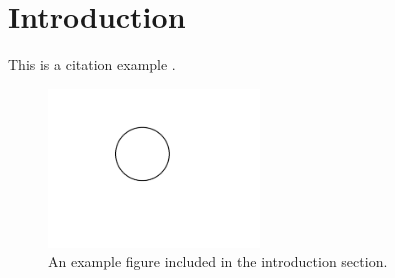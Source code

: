 \section{Introduction}
This is a citation example \cite{example2024}.

\begin{figure}[h]
    \centering
    \includegraphics[width=0.5\textwidth]{figures/fig1.png}
    \caption{An example figure included in the introduction section.}
    \label{fig:exp}
\end{figure}